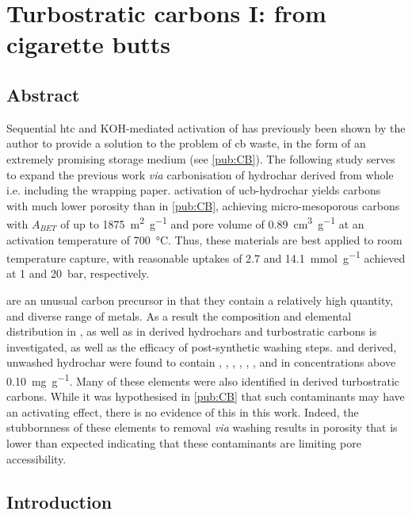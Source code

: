 \chapter{Turbostratic carbons I: from cigarette butts}
\label{ch:cbs}

\newpage
\section*{Abstract}

Sequential \gls{htc} and KOH-mediated activation of  has previously been shown by the author to provide a solution to the problem of \acrfull{cb} waste, in the form of an extremely promising  storage medium (see \ref{pub:CB}). The following study serves to expand the previous work \textit{via} carbonisation of \gls{hydrochar} derived from whole  i.e. including the wrapping paper.  activation of \acrshort{ucb}-\gls{hydrochar} yields carbons with much lower porosity than in \ref{pub:CB}, achieving micro-mesoporous carbons with $A_{BET}$ of up to \qty{1875}{\metre\squared\per\gram} and pore volume of \qty{0.89}{\cm\cubed\per\gram} at an activation temperature of \qty{700}{\degreeCelsius}. Thus, these materials are best applied to room temperature  capture, with reasonable uptakes of \num{2.7} and \qty{14.1}{\milli\mole\per\gram} achieved at 1 and \qty{20}{\bar}, respectively.

 are an unusual carbon precursor in that they contain a relatively high quantity, and diverse range of metals. As a result the composition and elemental distribution in , as well as in derived \glspl{hydrochar} and \glspl{turbostratic carbon} is investigated, as well as the efficacy of post-synthetic washing steps.  and derived, unwashed \gls{hydrochar} were found to contain , , , , , , and  in concentrations above \qty{0.10}{\mg\per\gram}. Many of these elements were also identified in derived \glspl{turbostratic carbon}. While it was hypothesised in \ref{pub:CB} that such contaminants may have an activating effect, there is no evidence of this in this work. Indeed, the stubbornness of these elements to removal \textit{via}  washing results in porosity that is lower than expected indicating that these contaminants are limiting pore accessibility.

\newpage
\section{Introduction}

